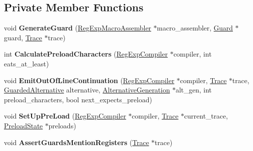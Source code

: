 \subsection*{Private Member Functions}
\begin{DoxyCompactItemize}
\item 
void {\bfseries Generate\+Guard} (\hyperlink{classv8_1_1internal_1_1_reg_exp_macro_assembler}{Reg\+Exp\+Macro\+Assembler} $\ast$macro\+\_\+assembler, \hyperlink{classv8_1_1internal_1_1_guard}{Guard} $\ast$guard, \hyperlink{classv8_1_1internal_1_1_trace}{Trace} $\ast$trace)\hypertarget{classv8_1_1internal_1_1_choice_node_ae873e6a022acc8e668e81c5887fd0044}{}\label{classv8_1_1internal_1_1_choice_node_ae873e6a022acc8e668e81c5887fd0044}

\item 
int {\bfseries Calculate\+Preload\+Characters} (\hyperlink{classv8_1_1internal_1_1_reg_exp_compiler}{Reg\+Exp\+Compiler} $\ast$compiler, int eats\+\_\+at\+\_\+least)\hypertarget{classv8_1_1internal_1_1_choice_node_a5302b6693d6f1a2327a8ded4e9665048}{}\label{classv8_1_1internal_1_1_choice_node_a5302b6693d6f1a2327a8ded4e9665048}

\item 
void {\bfseries Emit\+Out\+Of\+Line\+Continuation} (\hyperlink{classv8_1_1internal_1_1_reg_exp_compiler}{Reg\+Exp\+Compiler} $\ast$compiler, \hyperlink{classv8_1_1internal_1_1_trace}{Trace} $\ast$trace, \hyperlink{classv8_1_1internal_1_1_guarded_alternative}{Guarded\+Alternative} alternative, \hyperlink{classv8_1_1internal_1_1_alternative_generation}{Alternative\+Generation} $\ast$alt\+\_\+gen, int preload\+\_\+characters, bool next\+\_\+expects\+\_\+preload)\hypertarget{classv8_1_1internal_1_1_choice_node_aa604cb60fcc988f447326ce7e36288ba}{}\label{classv8_1_1internal_1_1_choice_node_aa604cb60fcc988f447326ce7e36288ba}

\item 
void {\bfseries Set\+Up\+Pre\+Load} (\hyperlink{classv8_1_1internal_1_1_reg_exp_compiler}{Reg\+Exp\+Compiler} $\ast$compiler, \hyperlink{classv8_1_1internal_1_1_trace}{Trace} $\ast$current\+\_\+trace, \hyperlink{structv8_1_1internal_1_1_preload_state}{Preload\+State} $\ast$preloads)\hypertarget{classv8_1_1internal_1_1_choice_node_aa6904b50c6c0725a17efbf624760bcb1}{}\label{classv8_1_1internal_1_1_choice_node_aa6904b50c6c0725a17efbf624760bcb1}

\item 
void {\bfseries Assert\+Guards\+Mention\+Registers} (\hyperlink{classv8_1_1internal_1_1_trace}{Trace} $\ast$trace)\hypertarget{classv8_1_1internal_1_1_choice_node_ae1dfdd9c06dbfaa79334a79aa1e6db58}{}\label{classv8_1_1internal_1_1_choice_node_ae1dfdd9c06dbfaa79334a79aa1e6db58}


\end{DoxyCompactItemize}
